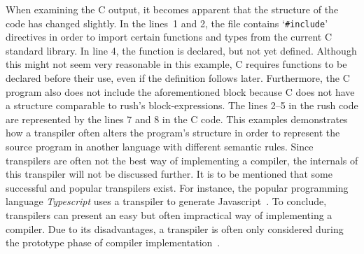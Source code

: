 When examining the C output, it becomes apparent that the structure of the code has changed slightly.
In the lines~1 and 2, the file contains `\texttt{\#include}' directives in order to import certain functions and types from the current C standard library.
In line 4, the  function is declared, but not yet defined.
Although this might not seem very reasonable in this example,
C requires functions to be declared before their use, even if the definition follows later.
Furthermore, the C program also does not include the aforementioned block because C does not have a structure comparable to rush's block-expressions.
The lines 2--5 in the rush code are represented by the lines 7 and 8 in the C code.
This examples demonstrates how a transpiler often alters the program's structure in order to represent the source program in another language with different semantic rules.
Since transpilers are often not the best way of implementing a compiler, the internals of this transpiler will not be discussed further.
It is to be mentioned that some successful and popular transpilers exist.
For instance, the popular programming language \emph{Typescript} uses a transpiler to generate Javascript~\cite[Chapter~2]{Cherny2019-rd}.
To conclude, transpilers can present an easy but often impractical way of implementing a compiler.
Due to its disadvantages, a transpiler is often only considered during the prototype phase of compiler implementation~\cite[p.~5]{Jeffery2021}.
